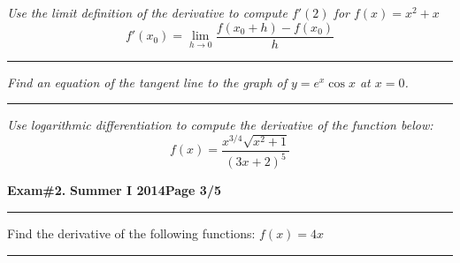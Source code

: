 \documentclass[12pt]{article}
\begin{document}
\bigskip
{\problem[10 pts] \em Use the limit definition of the derivative to
compute $f'(2)$ for $f(x)=x^2+x$}
\begin{equation*}
f'(x_0) = \lim_{h \to 0} \frac{ f(x_0+h)-f(x_0)}{h}
\end{equation*}
\vspace{2cm}
\begin{flushright}
\end{flushright}
\hrule
{\problem[10 pts] \em Find an equation of the tangent line to the graph
of $y=e^x \cos x$ at $x=0$.}
\vspace{4cm}
\begin{flushright}
\end{flushright}
\hrule
{\problem[10 pts] \em Use logarithmic differentiation to compute the
derivative of the function below:}
\begin{equation*}
f(x) = \frac{x^{3/4} \sqrt{x^2+1}}{(3x+2)^5}
\end{equation*}
\vspace{7cm}
\begin{flushright}
\end{flushright}
\newpage

\hfill{\large\bf Exam\#2.}\hfill{\large\bf
  Summer I 2014}\hfill{\large\bf Page 3/5}\hrule

\bigskip
\noindent Find the derivative of the following functions:
{\problem[2 pts] $f(x)=4x$}
\begin{flushright}
\end{flushright}
\hrule
\end{document}
